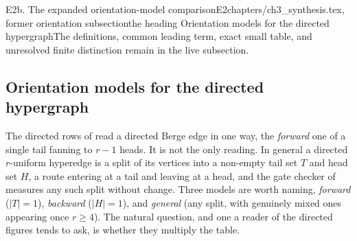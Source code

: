 \begin{offcut}{E2b. The expanded orientation-model comparison}{E2}{chapters/ch3\_synthesis.tex, former orientation subsection}{the heading Orientation models for the directed hypergraph}{The definitions, common leading term, exact small table, and unresolved finite distinction remain in the live subsection.}
\subsection{Orientation models for the directed hypergraph}

The directed rows of  read a directed Berge edge in one way, the \emph{forward} one of a single tail fanning to $r-1$ heads. It is not the only reading. In general a directed $r$-uniform hyperedge is a split of its vertices into a non-empty tail set $T$ and head set $H$, a route entering at a tail and leaving at a head, and the gate checker of  measures any such split without change. Three models are worth naming, \emph{forward} ($|T| = 1$), \emph{backward} ($|H| = 1$), and \emph{general} (any split, with genuinely mixed ones appearing once $r \ge 4$). The natural question, and one a reader of the directed figures tends to ask, is whether they multiply the table.


\end{offcut}
